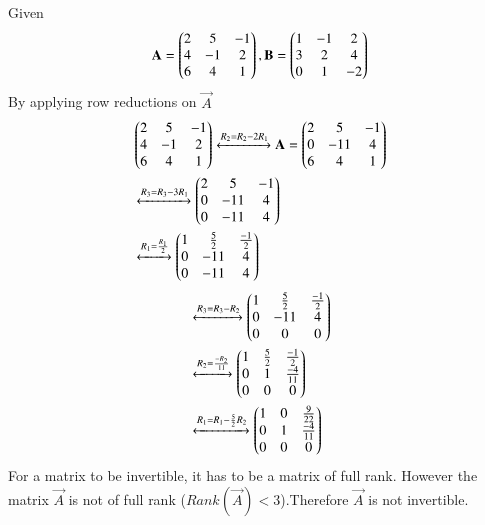 Given 
\begin{align}
\mathbf{A}=\begin{pmatrix}2&5&-1\\4&-1&2\\6&4&1\end{pmatrix},
\mathbf{B}=\begin{pmatrix}1&-1&2\\3&2&4\\0&1&-2\end{pmatrix}
\end{align}
 By applying row reductions on $\vec{A}$
 \begin{align}
&\begin{pmatrix}2&5&-1\\4&-1&2\\6&4&1\end{pmatrix}\xleftrightarrow{R_2=R_2-2R_1}\mathbf{A}=\begin{pmatrix}2&5&-1\\0&-11&4\\6&4&1\end{pmatrix}\\
&\xleftrightarrow{R_3=R_3-3R_1}\begin{pmatrix}2&5&-1\\0&-11&4\\0&-11&4\end{pmatrix}\\
&\xleftrightarrow{R_1=\frac{R_1}{2}}\begin{pmatrix}1&\frac{5}{2}&\frac{-1}{2}\\0&-11&4\\0&-11&4\end{pmatrix}
\end{align}
\begin{align}
&\xleftrightarrow{R_3=R_3-R_2}\begin{pmatrix}1&\frac{5}{2}&\frac{-1}{2}\\0&-11&4\\0&0&0\end{pmatrix}\\
&\xleftrightarrow{R_2=\frac{-R_2}{11}}\begin{pmatrix}1&\frac{5}{2}&\frac{-1}{2}\\0&1&\frac{-4}{11}\\0&0&0\end{pmatrix}\\
&\xleftrightarrow{R_1=R_1-\frac{5}{2}R_2}\begin{pmatrix}1&0&\frac{9}{22}\\0&1&\frac{-4}{11}\\0&0&0\end{pmatrix}
\end{align}
For a matrix to be invertible, it has to be a matrix of full rank. However the matrix $\vec{A}$ is not of full rank ($Rank(\vec{A})<3$).Therefore $\vec{A}$ is not invertible.

